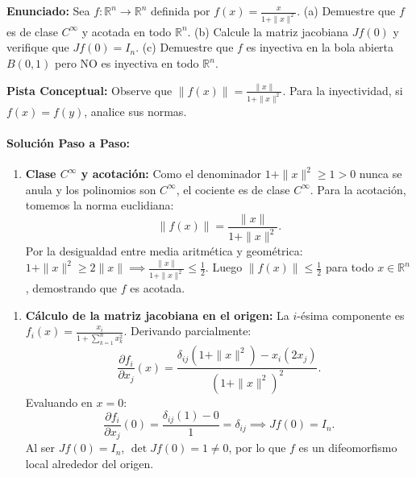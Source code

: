 \documentclass[11pt,a4paper]{article}
\begin{document}
\begin{tcolorbox}[colback=white,colframe=gray!40,arc=1mm,boxrule=0.5pt,left=3mm,right=3mm,top=2mm,bottom=2mm]
\textbf{Enunciado:} Sea $f: \mathbb{R}^n \to \mathbb{R}^n$ definida por $f(x) = \frac{x}{1 + \|x\|^2}$. (a) Demuestre que $f$ es de clase $C^\infty$ y acotada en todo $\mathbb{R}^n$. (b) Calcule la matriz jacobiana $Jf(0)$ y verifique que $Jf(0) = I_n$. (c) Demuestre que $f$ es inyectiva en la bola abierta $B(0, 1)$ pero NO es inyectiva en todo $\mathbb{R}^n$.
\end{tcolorbox}

\begin{tcolorbox}[colback=yellow!4,colframe=accentamber!70,arc=1mm,boxrule=0.5pt,left=3mm,right=3mm,top=1.5mm,bottom=1.5mm]
\textbf{Pista Conceptual:} Observe que $\|f(x)\| = \frac{\|x\|}{1+\|x\|^2}$. Para la inyectividad, si $f(x) = f(y)$, analice sus normas.
\end{tcolorbox}

\paragraph{Solución Paso a Paso:}\par
\begin{enumerate}[label=\textbf{\arabic*.}]
\item \textbf{Clase $C^\infty$ y acotación:}
Como el denominador $1 + \|x\|^2 \ge 1 > 0$ nunca se anula y los polinomios son $C^\infty$, el cociente es de clase $C^\infty$.
Para la acotación, tomemos la norma euclidiana:
\begin{equation*}
\|f(x)\| = \frac{\|x\|}{1 + \|x\|^2}.
\end{equation*}
Por la desigualdad entre media aritmética y geométrica: $1 + \|x\|^2 \ge 2\|x\| \implies \frac{\|x\|}{1 + \|x\|^2} \le \frac{1}{2}$.
Luego $\|f(x)\| \le \frac{1}{2}$ para todo $x \in \mathbb{R}^n$, demostrando que $f$ es acotada.
\end{enumerate}

\begin{enumerate}[label=\textbf{\arabic*.}]
\item \textbf{Cálculo de la matriz jacobiana en el origen:}
La $i$-ésima componente es $f_i(x) = \frac{x_i}{1 + \sum_{k=1}^n x_k^2}$.
Derivando parcialmente:
\begin{equation*}
\frac{\partial f_i}{\partial x_j}(x) = \frac{\delta_{ij}(1 + \|x\|^2) - x_i (2x_j)}{(1 + \|x\|^2)^2}.
\end{equation*}
Evaluando en $x = 0$:
\begin{equation*}
\frac{\partial f_i}{\partial x_j}(0) = \frac{\delta_{ij}(1) - 0}{1} = \delta_{ij} \implies Jf(0) = I_n.
\end{equation*}
Al ser $Jf(0) = I_n$, $\det Jf(0) = 1 \neq 0$, por lo que $f$ es un difeomorfismo local alrededor del origen.
\end{enumerate}
\end{document}
